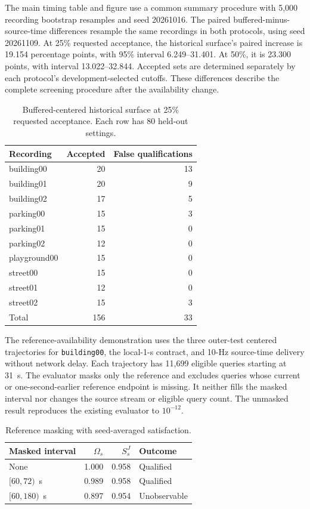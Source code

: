 \documentclass[journal]{IEEEtran}
\newcommand{\revision}[1]{#1}
\begin{document}
\revision{The main timing table and figure use a common summary procedure
with 5,000 recording bootstrap resamples and seed 20261016. The paired
buffered-minus-source-time differences resample the same recordings in
both protocols, using seed 20261109. At 25\% requested acceptance, the
historical surface's paired increase is 19.154 percentage points, with
95\% interval 6.249--31.401. At 50\%, it is 23.300 points, with interval
13.022--32.844. Accepted sets are determined separately by each protocol's
development-selected cutoffs. These differences describe the complete
screening procedure after the availability change.}

\begin{table}[t]
\centering
\caption{Buffered-centered historical surface at 25\% requested acceptance.
Each row has 80 held-out settings.}
\begin{tabular}{lrr}
\toprule
Recording & Accepted & False qualifications\\
\midrule
building00 & 20 & 13\\
building01 & 20 & 9\\
building02 & 17 & 5\\
parking00 & 15 & 3\\
parking01 & 15 & 0\\
parking02 & 12 & 0\\
playground00 & 15 & 0\\
street00 & 15 & 0\\
street01 & 12 & 0\\
street02 & 15 & 3\\
\midrule
Total & 156 & 33\\
\bottomrule
\end{tabular}
\end{table}

\revision{The reference-availability demonstration uses the three outer-test
centered trajectories for \texttt{building00}, the local-1-s contract,
and 10-Hz source-time delivery without network delay. Each trajectory has
11,699 eligible queries starting at 31~s. The evaluator masks only the
reference and excludes queries whose current or one-second-earlier
reference endpoint is missing. It neither fills the masked interval nor
changes the source stream or eligible query count. The unmasked result
reproduces the existing evaluator to $10^{-12}$.}

\begin{table}[t]
\centering
\caption{Reference masking with seed-averaged satisfaction.}
\begin{tabular}{lrrl}
\toprule
Masked interval & $\Omega_s$ & $S_s^J$ & Outcome\\
\midrule
None & 1.000 & 0.958 & Qualified\\
$[60,72)$~s & 0.989 & 0.958 & Qualified\\
$[60,180)$~s & 0.897 & 0.954 & Unobservable\\
\bottomrule
\end{tabular}
\end{table}
\end{document}

